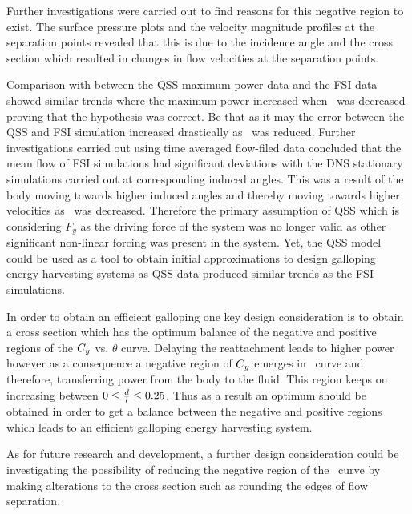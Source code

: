 Further investigations were carried out to find reasons for this negative region to exist. The surface pressure plots and the velocity magnitude profiles at the separation points revealed that this is due to the incidence angle and the cross section which resulted in changes in flow velocities at the separation points. 

Comparison with between the QSS maximum power data and the FSI data showed similar trends where the maximum power increased when \ratio\ was decreased proving that the hypothesis was correct. Be that as it may the error between the QSS and FSI simulation increased drastically as \ratio\ was reduced. Further investigations carried out using time averaged flow-filed data concluded that the mean flow of FSI simulations had significant deviations with the DNS stationary simulations carried out at corresponding induced angles. This was a result of the body moving towards higher induced angles and thereby moving towards higher velocities as \ratio\ was decreased. Therefore the primary assumption of QSS which is considering $F_y$ as the driving force of the system was no longer valid as other significant non-linear forcing was present in the system. Yet, the QSS model could be used as a tool to obtain initial approximations to design galloping energy harvesting systems as QSS data produced similar trends as the FSI simulations.

In order to obtain an efficient galloping one key design consideration is to obtain a cross section which has the optimum balance of the negative and positive regions of the $C_{y}$ vs. $\theta$ curve. Delaying the reattachment leads to higher power however as a consequence a negative region of $C_{y}$ emerges in \cy\ curve and therefore, transferring power from the body to the fluid. This region keeps on increasing between $0\leq\frac{d}{l}\leq0.25$. Thus as a result an optimum \ratio should be obtained in order to get a balance between the negative and positive regions which leads to an efficient galloping energy harvesting system. 

As for future research and development, a further design consideration could be investigating the possibility of reducing the negative region of the \cy\ curve by making alterations to the cross section such as rounding the edges of flow separation. 

 

      




